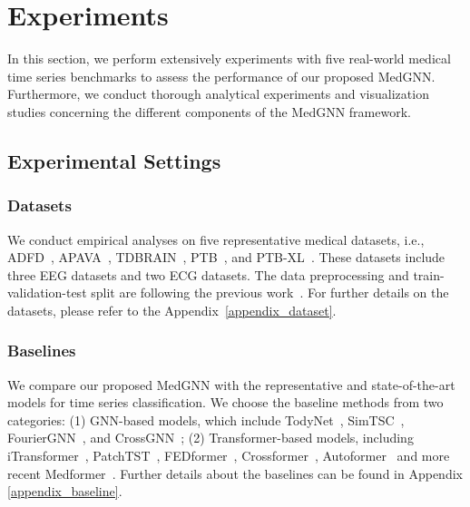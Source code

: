 \vspace{-1.5mm}
\section{Experiments}
In this section, we perform extensively experiments with five real-world medical time series benchmarks to assess the performance of our proposed MedGNN.
Furthermore, we conduct thorough analytical experiments and visualization studies concerning the different components of the MedGNN framework.



\vspace{-2mm}
\subsection{Experimental Settings}

\subsubsection{Datasets}
We conduct empirical analyses on five representative medical datasets,
i.e., ADFD~\cite{miltiadous2023dataset}, APAVA~\cite{escudero2006analysis}, TDBRAIN~\cite{van2022two}, PTB~\cite{physiobank2000physionet}, and PTB-XL~\cite{wagner2020ptb}. 
These datasets include three EEG datasets and two ECG datasets.
The data preprocessing and train-validation-test split are following the previous work~\cite{wang2024medformer}.
For further details on the datasets, please refer to the Appendix~\ref{appendix_dataset}.


\subsubsection{Baselines}
We compare our proposed MedGNN with the representative and state-of-the-art models for time series classification. 
We choose the baseline methods from two categories: (1) GNN-based models, which include TodyNet~\cite{liu2024todynet}, SimTSC~\cite{zha2022towards}, FourierGNN~\cite{yi2024fouriergnn}, and CrossGNN~\cite{huang2023crossgnn}; (2) Transformer-based models, including iTransformer~\cite{liu2023itransformer}, PatchTST~\cite{nie2022time}, FEDformer~\cite{zhou2022fedformer}, Crossformer~\cite{zhang2022crossformer}, Autoformer~\cite{wu2021autoformer} and more recent Medformer~\cite{wang2024medformer}. Further details about the baselines can be found in Appendix \ref{appendix_baseline}.


